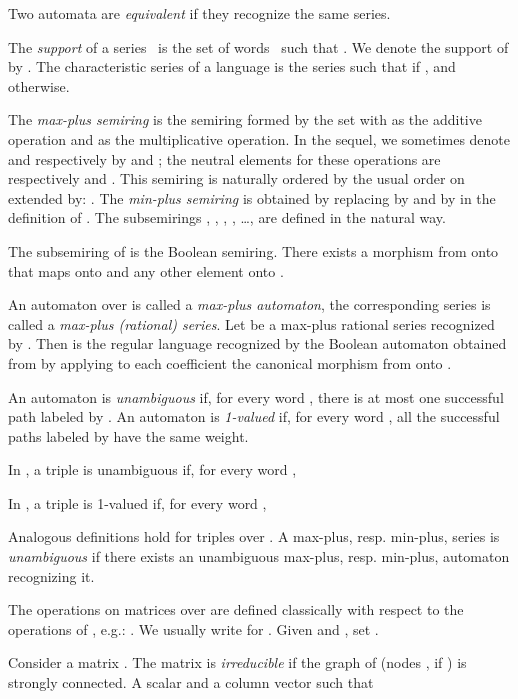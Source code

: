 \documentclass{article}
\newcommand{\1}{\mathbb{1}}
\newcommand{\0}{\mathbb{0}}
\begin{document}
Two automata are {\em equivalent} if they recognize the same series. 

\medskip

The {\em support} of a series~ is the set of words~ such that
 . We denote the support of  by . The
 characteristic series of a language  is the series 
   such that  if , and
   otherwise.

\medskip

The {\em max-plus semiring}  is the semiring formed by the set
 with  as 
the additive operation and  as the multiplicative operation.
In the sequel, we sometimes denote  and  respectively by  and
; the neutral elements for these operations are respectively
 and . This semiring
is naturally ordered by the usual order on  extended by: . 
The {\em min-plus semiring}  is obtained by replacing
 by  and  by 
in the definition of .
The subsemirings , , , , \ldots, are defined in the natural
way. 


The subsemiring  of  is
the Boolean semiring. 
There exists a
morphism from  
onto  that maps  onto  and
any other element onto .

\medskip

An automaton over  is called a {\em max-plus
automaton}, the corresponding series is called a {\em max-plus
(rational) series}.
Let  be a max-plus
  rational series recognized by
. Then  is the regular language 
recognized
by the Boolean automaton obtained from  by
applying to each coefficient the canonical morphism from  onto
. 

\medskip

An automaton is {\em unambiguous} if, for every word ,
there is at most one successful path labeled by .
An automaton is {\em 1-valued} if, for every word ,
all the successful paths labeled by  have the same weight.

In , a triple  is unambiguous if, for every word ,

In , a triple  is 1-valued if,
for every word ,

Analogous definitions hold for triples over . 
A max-plus, resp. min-plus, series is {\em unambiguous} if there exists 
an unambiguous max-plus, resp. min-plus, automaton recognizing it.

\medskip

The operations on matrices over  are defined classically
with respect to the operations of , e.g.:
. We usually write  for . 
Given  and , set . 

\medskip

Consider a matrix . The matrix  is {\em
  irreducible} if the graph of  (nodes ,  if
  ) is strongly connected. A  scalar 
and a column vector  such that 
\end{document}
